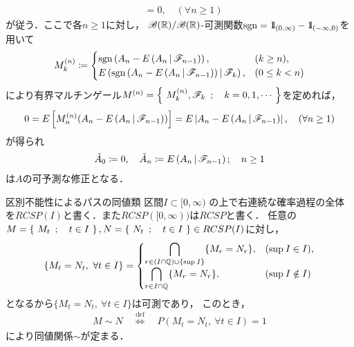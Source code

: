 \begin{prf}
\begin{align}
			&= 0,
			\quad (\forall n \geq 1)
		\end{align}
		が従う．ここで各$n \geq 1$に対し，
		$\mathscr{B}(\mathbb{R})/\mathscr{B}(\mathbb{R})$-可測関数$\operatorname{sgn} = \mbox{1}\hspace{-0.25em}\mbox{l}_{(0,\infty)} - \mbox{1}\hspace{-0.25em}\mbox{l}_{(-\infty,0)}$を用いて
		\begin{align}
			M^{(n)}_k \coloneqq 
			\begin{cases}
				\operatorname{sgn}\left( A_n - E\left( A_n \, \middle|\, \mathscr{F}_{n-1} \right) \right), & (k \geq n), \\
				E\left( \operatorname{sgn}\left( A_n - E\left( A_n \, \middle|\, \mathscr{F}_{n-1} \right) \right) \, \middle|\, \mathscr{F}_k \right), & (0 \leq k < n)
			\end{cases}
		\end{align}
		により有界マルチンゲール$M^{(n)} = \left\{\ M^{(n)}_k,\mathscr{F}_k\ \, ; \quad k=0,1,\cdots\ \right\}$を定めれば，
		\begin{align}
			0 = E\left[ M^{(n)}_n(A_n - E\left( A_n \, \middle|\, \mathscr{F}_{n-1} \right)) \right] 
			= E\left| A_n - E\left( A_n \, \middle|\, \mathscr{F}_{n-1} \right) \right|,
			\quad (\forall n \geq 1)
		\end{align}
		が得られ
		\begin{align}
			\tilde{A}_0 \coloneqq 0,
			\quad \tilde{A}_n \coloneqq E\left( A_n \, \middle|\, \mathscr{F}_{n-1} \right); \quad n \geq 1
		\end{align}
		は$A$の可予測な修正となる．
		\QED
	\end{prf}
	
	\begin{itembox}[l]{区別不能性によるパスの同値類}
		区間\footnotemark $I \subset [0,\infty)$
		の上で右連続な確率過程の全体を$RCSP(I)$と書く．また$RCSP([0,\infty))$は$RCSP$と書く．
		任意の$M = \left\{\ M_t\ \, ; \quad t \in I\ \right\},N = \left\{\ N_t\ \, ; \quad t \in I\ \right\} \in RCSP(I)$に対し，
		\begin{align}
			\{M_t = N_t,\ \forall t \in I\} = 
			\begin{cases}
				\displaystyle \bigcap_{r \in (I \cap \mathbb{Q}) \cup \{\operatorname*{sup}_{} I\}}\{M_r = N_r\}, & (\operatorname*{sup}_{} I \in I), \\
				\displaystyle \bigcap_{r \in I \cap \mathbb{Q}}\{M_r = N_r\}, & (\operatorname*{sup}_{} I \notin I)
			\end{cases}
		\end{align}
		となるから$\{M_t = N_t,\ \forall t \in I\}$は可測であり，
		このとき，
		\begin{align}
			M \sim N \quad \overset{\mathrm{def}}{\Longleftrightarrow} \quad 
			P(M_t = N_t,\ \forall t \in I) = 1
			\label{eq:equivalence_with_respect_to_path}
		\end{align}
		により同値関係$\sim$が定まる．
	\end{itembox}
	\footnotetext{
		この場合区間は$[a,b],(a,b),[a,b),(a,b],[a,\infty),(a,\infty),\ (0 \leq a < b < \infty)$のいずれかと考える．
	}
	

